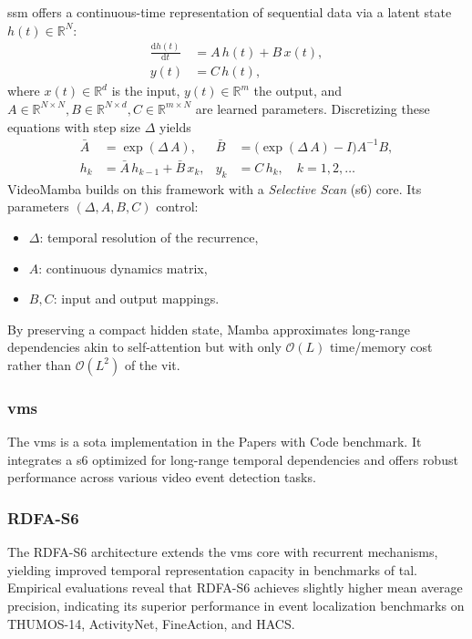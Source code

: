 \acrfull{ssm} offers a continuous-time representation of sequential data via a latent state \(h(t)\in\mathbb{R}^N\):
\begin{align}
    \frac{\mathrm{d}h(t)}{\mathrm{d}t} &= A\,h(t) + B\,x(t),  \label{eq:ssm_continuous1}\\
    y(t) &= C\,h(t),                                    \label{eq:ssm_continuous2}
\end{align}
where \(x(t)\in\mathbb{R}^d\) is the input, \(y(t)\in\mathbb{R}^m\) the output, and \(A\in\mathbb{R}^{N\times N}, B\in\mathbb{R}^{N\times d}, C\in\mathbb{R}^{m\times N}\) are learned parameters.  Discretizing these equations with step size \(\Delta\) yields
\begin{align}
    \bar A &= \exp(\Delta\,A), 
    & 
    \bar B &= \bigl(\exp(\Delta\,A)-I\bigr)A^{-1}B,\\
    h_k &= \bar A\,h_{k-1} + \bar B\,x_k, 
    &
    y_k &= C\,h_k,
    \quad k=1,2,\dots
\end{align}
VideoMamba \cite{li_videomamba_2024} builds on this framework with a \emph{Selective Scan} (\acrshort{s6}) core. Its parameters \((\Delta, A,B,C)\) control:
\begin{itemize}
    \item \(\Delta\): temporal resolution of the recurrence,
    \item \(A\): continuous dynamics matrix,
    \item \(B,C\): input and output mappings.
\end{itemize}

By preserving a compact hidden state, Mamba approximates long-range dependencies akin to self-attention but with only \(\mathcal{O}(L)\) time/memory cost rather than \(\mathcal{O}(L^2)\) of the \acrlong{vit}.  

\subsubsection{\acrfull{vms}}
The \acrfull{vms} is a \acrfull{sota} implementation in the Papers with Code benchmark. It integrates a \acrlong{s6} optimized for long-range temporal dependencies and offers robust performance across various video event detection tasks. 

\subsubsection{RDFA-S6}
The RDFA-S6 architecture extends the \acrshort{vms} core with recurrent mechanisms, yielding improved temporal representation capacity in benchmarks of \acrfull{tal}. Empirical evaluations reveal that RDFA-S6 achieves slightly higher mean average precision, indicating its superior performance in event localization benchmarks on THUMOS-14, ActivityNet, FineAction, and HACS.

